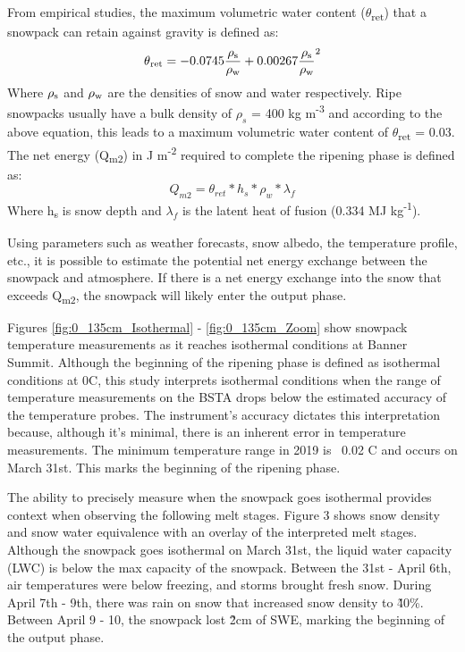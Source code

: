 From empirical studies, the maximum volumetric water content ($\theta$\textsubscript{ret}) that a snowpack can retain against gravity is defined as: 
\begin{equation}
\theta \textsubscript{ret} = -0.0745\frac{\rho \textsubscript{s}}{\rho \textsubscript{w}}
+ 0.00267\frac{\rho \textsubscript{s}}{\rho \textsubscript{w}}^2 
\end{equation}
Where $\rho \textsubscript{s}$ and $\rho \textsubscript{w}$ are the densities of snow and water respectively. Ripe snowpacks usually have a bulk density of $\rho_s$ = 400 kg m\textsuperscript{-3} and according to the above equation, this leads to a maximum volumetric water content of $\theta$\textsubscript{ret} = 0.03. The net energy (Q\textsubscript{m2}) in J m\textsuperscript{-2} required to complete the ripening phase is defined as: 
\begin{equation}
Q_{m2} = \theta_{ret} * h_s * \rho_w * \lambda_f
\end{equation}
Where h\textsubscript{s} is snow depth and $\lambda_f$ is the latent heat of fusion (0.334 MJ kg\textsuperscript{-1}). 

Using parameters such as weather forecasts, snow albedo, the temperature profile, etc., it is possible to estimate the potential net energy exchange between the snowpack and atmosphere. If there is a net energy exchange into the snow that exceeds Q\textsubscript{m2}, the snowpack will likely enter the output phase.  

Figures \ref{fig:0_135cm_Isothermal} - \ref{fig:0_135cm_Zoom} show snowpack temperature measurements as it reaches isothermal conditions at Banner Summit. Although the beginning of the ripening phase is defined as isothermal conditions at 0\textdegree C, this study interprets isothermal conditions when the range of temperature measurements on the BSTA drops below the estimated accuracy of the temperature probes. The instrument's accuracy dictates this interpretation because, although it's minimal, there is an inherent error in temperature measurements. The minimum temperature range in 2019 is ~0.02 C and occurs on March 31st. This marks the beginning of the ripening phase.

The ability to precisely measure when the snowpack goes isothermal provides context when observing the following melt stages. Figure 3 shows snow density and snow water equivalence with an overlay of the interpreted melt stages. Although the snowpack goes isothermal on March 31st, the liquid water capacity (LWC) is below the max capacity of the snowpack. Between the 31st - April 6th, air temperatures were below freezing, and storms brought fresh snow. During April 7th - 9th, there was rain on snow that increased snow density to \~40\%. Between April 9 - 10, the snowpack lost \~2cm of SWE, marking the beginning of the output phase.    

